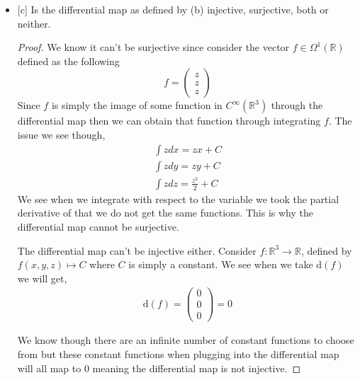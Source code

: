 \documentclass[12pt]{article}
\newcommand      {\Rm}         {{\mathbb R}}
\begin{document}
\begin{itemize}
\begin{itemize}
\begin{proof}
\begin{align*}
                &= \alpha(\frac{\partial f}{\partial x} dx + \frac{\partial f}{\partial y} dy + \frac{\partial f}{\partial z} \partial z) + \beta(\frac{\partial g}{\partial x} dx + \frac{\partial f}{\partial y} dy + \frac{\partial g}{\partial z} dz) \\
                &= \alpha \text{d}(f) + \beta \text{d}(g)
            \end{align*}
            With all that we can see that the differential function is closed under scalar multiplication and vector addition and is therefore linear. 
        \end{proof}

        \item{[c]} Is the differential map as defined by (b) injective, surjective, both or neither. 
        \begin{proof}
            We know it can't be surjective since consider the vector $f \in \Omega^1(\Rm)$ defined as the following \[f= \begin{pmatrix}z\\z\\z \end{pmatrix}\] Since $f$ is simply the image of some function in $C^\infty(\Rm^3)$ through the differential map then we can obtain that function through integrating $f$. The issue we see though,
            \begin{align*}
                \int z dx = zx + C \\
                \int z dy = zy + C \\
                \int z dz = \frac{z^2}{2} + C
            \end{align*}
            We see when we integrate with respect to the variable we took the partial derivative of that we do not get the same functions. This is why the differential map cannot be surjective. 

            The differential map can't be injective either. Consider $f: \Rm^3 \to \Rm$, defined by $f(x,y,z) \mapsto C$ where $C$ is simply a constant. We see when we take d$(f)$ we will get,
            \begin{align*}
                \text{d}(f) = \begin{pmatrix}0\\ 0\\ 0 \end{pmatrix} = 0
            \end{align*}

            We know though there are an infinite number of constant functions to choose from but these constant functions when plugging into the differential map will all map to 0 meaning the differential map is not injective. 


\end{proof}
\end{itemize}
\end{itemize}
\end{document}
